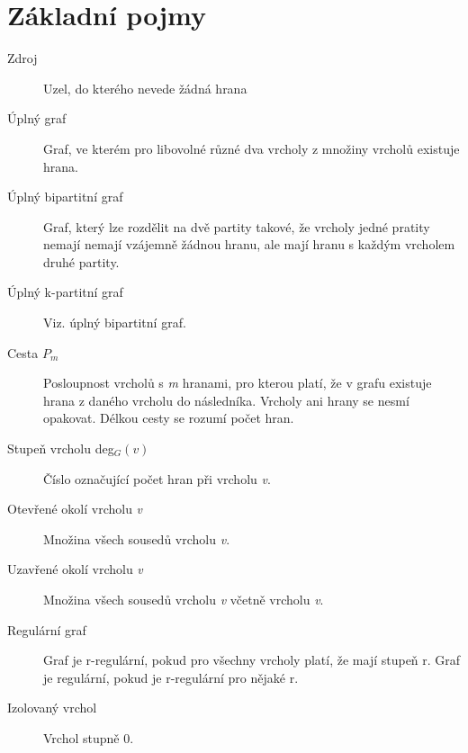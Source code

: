 \section{Základní pojmy}

  \begin{description}
    \item[Zdroj] Uzel, do kterého nevede žádná hrana
    \item[Úplný graf] Graf, ve kterém pro libovolné různé dva vrcholy z množiny vrcholů existuje hrana.
    \item[Úplný bipartitní graf] Graf, který lze rozdělit na dvě partity takové, že vrcholy jedné pratity nemají nemají vzájemně žádnou hranu, ale mají hranu s každým vrcholem druhé partity.
    \item[Úplný k-partitní graf] Viz. úplný bipartitní graf.
    \item[Cesta $P_m$] Posloupnost vrcholů s \emph{m} hranami, pro kterou platí, že v grafu existuje hrana z daného vrcholu do následníka. Vrcholy ani hrany se nesmí opakovat. Délkou cesty se rozumí počet hran.
    \item[Stupeň vrcholu deg$_G(v)$] Číslo označující počet hran při vrcholu \emph{v}.
    \item[Otevřené okolí vrcholu \emph{v}] Množina všech sousedů vrcholu \emph{v}.
    \item[Uzavřené okolí vrcholu \emph{v}] Množina všech sousedů vrcholu \emph{v} včetně vrcholu \emph{v}.
    \item[Regulární graf] Graf je r-regulární, pokud pro všechny vrcholy platí, že mají stupeň r. Graf je regulární, pokud je r-regulární pro nějaké r.
    \item[Izolovaný vrchol] Vrchol stupně 0.
  \end{description}

